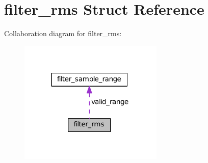 \hypertarget{structfilter__rms}{}\section{filter\+\_\+rms Struct Reference}
\label{structfilter__rms}


Collaboration diagram for filter\+\_\+rms\+:\nopagebreak
\begin{figure}[H]
\begin{center}
\leavevmode
\includegraphics[width=194pt]{structfilter__rms__coll__graph}
\end{center}
\end{figure}

